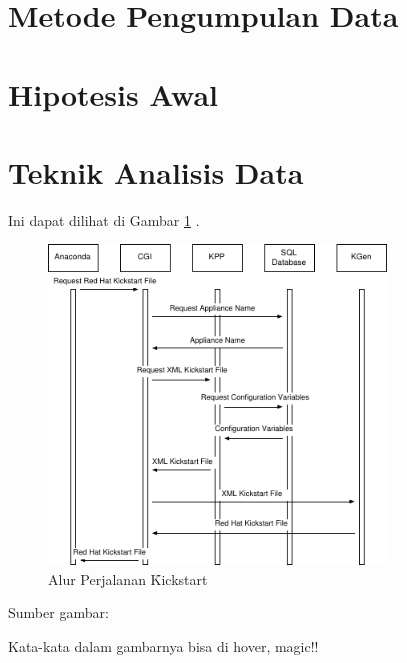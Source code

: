 \section{Metode Pengumpulan Data}

\section{Hipotesis Awal}

\section{Teknik Analisis Data}


Ini dapat dilihat di Gambar \ref{fig:alurkickstart} \citep{paper.jackson}. 

\begin{figure}
	\centering
	\includegraphics[width=0.8\textwidth,height=0.7\textwidth]
		{pics/alurkickstart.pdf}
	\caption{Alur Perjalanan \f{Kickstart}}
	\label{fig:alurkickstart}
\end{figure}
\begin{center}
{\small Sumber gambar: \citep{paper.jackson}}
\end{center}

Kata-kata dalam gambarnya bisa di hover, magic!!

